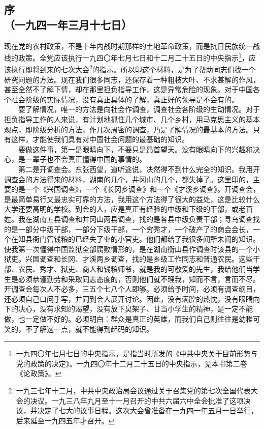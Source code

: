 \documentclass[cn,11pt,chinese]{elegantbook}
\def\myformat#1{\hfil\hfil #1}
\begin{document}
\subsection*{\myformat{序}\\
\myformat{（一九四一年三月十七日）}}
现在党的农村政策，不是十年内战时期那样的土地革命政策，而是抗日民族统一战线的政策。全党应该执行一九四〇年七月七日和十二月二十五日的中央指示\footnote[1]{ 一九四〇年七月七日的中央指示，是指当时所发的《中共中央关于目前形势与党的政策的决定》。一九四〇年十二月二十五日的中央指示，见本书第二卷《论政策》。}，应该执行即将到来的七次大会\footnote[2]{ 一九三七年十二月，中共中央政治局会议通过关于召集党的第七次全国代表大会的决议。一九三八年九月至十一月召开的中共六届六中全会批准了这项决议，并决定了七大的议事日程。这次大会曾准备在一九四一年五月一日举行，后来延至一九四五年才召开。}的指示。所以印这个材料，是为了帮助同志们找一个研究问题的方法。现在我们很多同志，还保存着一种粗枝大叶、不求甚解的作风，甚至全然不了解下情，却在那里担负指导工作，这是异常危险的现象。对于中国各个社会阶级的实际情况，没有真正具体的了解，真正好的领导是不会有的。\\
　　要了解情况，唯一的方法是向社会作调查，调查社会各阶级的生动情况。对于担负指导工作的人来说，有计划地抓住几个城市、几个乡村，用马克思主义的基本观点，即阶级分析的方法，作几次周密的调查，乃是了解情况的最基本的方法。只有这样，才能使我们具有对中国社会问题的最基础的知识。\\
　　要做这件事，第一是眼睛向下，不要只是昂首望天。没有眼睛向下的兴趣和决心，是一辈子也不会真正懂得中国的事情的。\\
　　第二是开调查会。东张西望，道听途说，决然得不到什么完全的知识。我用开调查会的方法得来的材料，湖南的几个，井冈山的几个，都失掉了。这里印的，主要的是一个《兴国调查》，一个《长冈乡调查》和一个《才溪乡调查》。开调查会，是最简单易行又最忠实可靠的方法，我用这个方法得了很大的益处，这是比较什么大学还要高明的学校。到会的人，应是真正有经验的中级和下级的干部，或老百姓。我在湖南五县调查和井冈山两县调查，找的是各县中级负责干部；寻乌调查找的是一部分中级干部，一部分下级干部，一个穷秀才，一个破产了的商会会长，一个在知县衙门管钱粮的已经失了业的小官吏。他们都给了我很多闻所未闻的知识。使我第一次懂得中国监狱全部腐败情形的，是在湖南衡山县作调查时该县的一个小狱吏。兴国调查和长冈、才溪两乡调查，找的是乡级工作同志和普通农民。这些干部、农民、秀才、狱吏、商人和钱粮师爷，就是我的可敬爱的先生，我给他们当学生是必须恭谨勤劳和采取同志态度的，否则他们就不理我，知而不言，言而不尽。开调查会每次人不必多，三五个七八个人即够。必须给予时间，必须有调查纲目，还必须自己口问手写，并同到会人展开讨论。因此，没有满腔的热忱，没有眼睛向下的决心，没有求知的渴望，没有放下臭架子、甘当小学生的精神，是一定不能做，也一定做不好的。必须明白：群众是真正的英雄，而我们自己则往往是幼稚可笑的，不了解这一点，就不能得到起码的知识。\\
\end{document}
